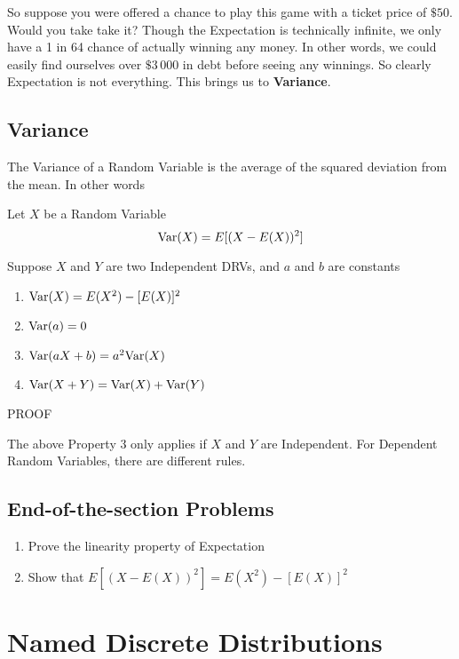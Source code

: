 \documentclass{report}
\begin{document}
So suppose you were offered a chance to play this game with a ticket price of $\$50$. Would you take take it? Though the Expectation is technically infinite, we only have a 1 in 64 chance of actually winning any money. In other words, we could easily find ourselves over $\$3\,000$ in debt before seeing any winnings.  So clearly Expectation is not everything. This brings us to \textbf{Variance}.

\subsection{Variance}
\newcommand{\Var}{\textup{Var}}
The Variance of a Random Variable is the average of the squared deviation from the mean. In other words
\begin{definition}
    Let $X$ be a Random Variable
    \[
        \Var(X)=E[(X-E(X))^2]   
    \]
\end{definition}


\begin{theorem}
    Suppose $X$ and $Y$ are two Independent DRVs, and $a$ and $b$ are constants
    \begin{enumerate}
        \item $\Var(X)=E(X^2)-[E(X)]^2$
        \item $\Var(a)=0$
        \item $\Var(aX+b)=a^2\Var(X)$
        \item $\Var(X+Y)=\Var(X)+\Var(Y)$
    \end{enumerate}
    \todo PROOF
\end{theorem}

\begin{notsofast}
    The above Property 3 only applies if $X$ and $Y$ are Independent. For Dependent Random Variables, there are different rules.
\end{notsofast}


\subsection{End-of-the-section Problems}
\begin{enumerate}
    \item Prove the linearity property of Expectation
    \item Show that $E[(X-E(X))^2]=E(X^2)-[E(X)]^2$
\end{enumerate}

\section{Named Discrete Distributions}
\end{document}
